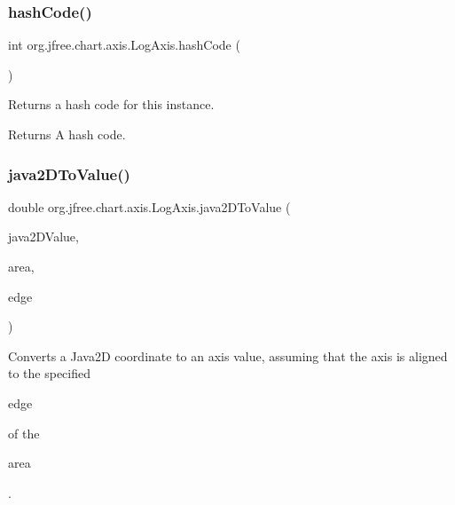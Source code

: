 \subsubsection{\texorpdfstring{hash\+Code()}{hashCode()}}
{\footnotesize\ttfamily int org.\+jfree.\+chart.\+axis.\+Log\+Axis.\+hash\+Code (\begin{DoxyParamCaption}{ }\end{DoxyParamCaption})}

Returns a hash code for this instance.

\begin{DoxyReturn}{Returns}
A hash code. 
\end{DoxyReturn}
\mbox{\label{classorg_1_1jfree_1_1chart_1_1axis_1_1_log_axis_a317a0e2e42c5f4a8a3cd44c7e1f89ec3}} 
\subsubsection{\texorpdfstring{java2\+D\+To\+Value()}{java2DToValue()}}
{\footnotesize\ttfamily double org.\+jfree.\+chart.\+axis.\+Log\+Axis.\+java2\+D\+To\+Value (\begin{DoxyParamCaption}\item[{double}]{java2\+D\+Value,  }\item[{Rectangle2D}]{area,  }\item[{Rectangle\+Edge}]{edge }\end{DoxyParamCaption})}

Converts a Java2D coordinate to an axis value, assuming that the axis is aligned to the specified
\begin{DoxyCode}
edge 
\end{DoxyCode}
 of the
\begin{DoxyCode}
area 
\end{DoxyCode}
 .


